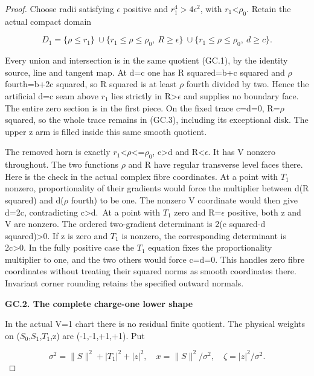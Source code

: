 \begin{proof}
Choose radii satisfying \(\epsilon\) positive and
\(r_1^4>4\epsilon^2\), with \(r_1\)\textless{}\(\rho_0\). Retain the actual compact
domain

\[
 D_1=\{\rho\le r_1\}\ \cup
 \{r_1\le\rho\le\rho_0,\ R\ge\epsilon\}\ \cup
 \{r_1\le\rho\le\rho_0,\ d\ge c\}.              \tag{GC.3}
\]

Every union and intersection is in the same quotient (GC.1), by
the identity source, line and tangent map. At d=c one has
R squared=b+c squared and \(\rho\) fourth=b+2c squared, so
R squared is at least \(\rho\) fourth divided by two. Hence the
artificial d=c seam above \(r_1\) lies strictly in R\textgreater{}\(\epsilon\) and
supplies no boundary face. The entire zero section is in the
first piece. On the fixed trace c=d=0, R=\(\rho\) squared, so the
whole trace remains in (GC.3), including its exceptional disk.
The upper z arm is filled inside this same smooth quotient.

The removed horn is exactly \(r_1\)\textless{}\(\rho\)\textless=\(\rho_0\), c\textgreater d and R\textless{}\(\epsilon\).
It has V nonzero throughout. The two functions \(\rho\) and R have
regular transverse level faces there. Here is the check in the
actual complex fibre coordinates. At a point with \(T_1\) nonzero,
proportionality of their gradients would force the multiplier
between d(R squared) and d(\(\rho\) fourth) to be one. The nonzero
V coordinate would then give d=2c, contradicting c\textgreater d.~At a
point with \(T_1\) zero and R=\(\epsilon\) positive, both z and V are
nonzero. The ordered two-gradient determinant is
2(c squared-d squared)\textgreater0. If z is zero and \(T_1\) is nonzero,
the corresponding determinant is 2c\textgreater0. In the fully positive
case the \(T_1\) equation fixes the proportionality multiplier
to one, and the two others would force c=d=0. This handles zero
fibre coordinates without treating their squared norms as
smooth coordinates there. Invariant corner rounding retains
the specified outward normals.

\par

\medskip\noindent\textbf{GC.2. The complete charge-one lower shape}

\par\nobreak

In the actual V=1 chart there is no residual finite quotient.
The physical weights on (\(S_0\),\(S_1\),\(T_1\),z) are (-1,-1,+1,+1). Put

\[
 \sigma^2=\|S\|^2+|T_1|^2+|z|^2,\quad
 x=\|S\|^2/\sigma^2,\quad \zeta=|z|^2/\sigma^2.
\]


\end{proof}
